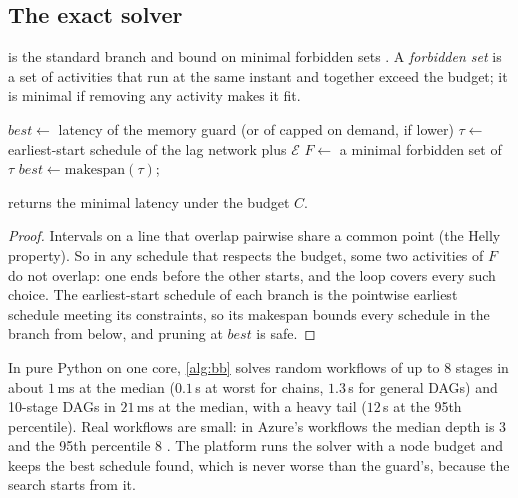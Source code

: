 \subsection{The exact solver}

 is the standard branch and bound on minimal forbidden sets
\cite{bartusch1988}. A \emph{forbidden set} is a set of activities that run at the same instant
and together exceed the budget; it is minimal if removing any activity makes it fit.

\begin{algorithm}[t]
\caption{\textsc{Exact}: minimal latency of one workflow under a memory budget $C$.}
\label{alg:bb}
\begin{algorithmic}[1]
\State $\mathit{best} \gets$ latency of the memory guard (or of capped on demand, if lower)
\State {}
 
  \State $\tau \gets$ earliest-start schedule of the lag network plus $\mathcal{E}$
    \State \Return
  \EndIf
  \State $F \gets$ a minimal forbidden set of $\tau$
    \State $\mathit{best} \gets \mathrm{makespan}(\tau)$; \Return
  \EndIf
    \State {}
  \EndFor
\EndProcedure
\end{algorithmic}
\end{algorithm}

\begin{proposition}[Exactness]
\label{prop:bb}
 returns the minimal latency under the budget $C$.
\end{proposition}

\begin{proof}
Intervals on a line that overlap pairwise share a common point (the Helly property). So in any
schedule that respects the budget, some two activities of $F$ do not overlap: one ends before
the other starts, and the loop covers every such choice. The earliest-start schedule of each
branch is the pointwise earliest schedule meeting its constraints, so its makespan bounds every
schedule in the branch from below, and pruning at $\mathit{best}$ is safe.
\end{proof}

In pure Python on one core, \cref{alg:bb} solves random workflows of up to 8 stages in about
$1$\,ms at the median ($0.1$\,s at worst for chains, $1.3$\,s for general DAGs) and 10-stage DAGs
in $21$\,ms at the median, with a heavy tail ($12$\,s at the 95th percentile). Real workflows are
small: in Azure's workflows the median depth is 3 and the 95th percentile 8 \cite{orion2022}. The
platform runs the solver with a node budget and keeps the best schedule found, which is never
worse than the guard's, because the search starts from it.

